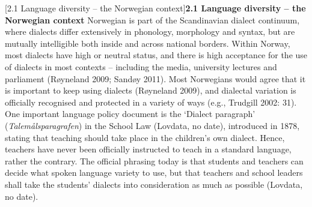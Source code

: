 \documentclass[12pt]{article}
\makeatletter
\renewcommand\section{\@startsection{section}{1}{0.0cm}{0in}{0.1mm}{\normalfont\normalsize\fontsize{12pt}{14.4pt}\selectfont\raggedright}}
\newenvironment{styleStandard}{\renewcommand\baselinestretch{1.0}\setlength\leftskip{0cm}\setlength\rightskip{0cm plus 1fil}\setlength\parindent{0cm}\setlength\parfillskip{0pt plus 1fil}\setlength\parskip{0in plus 1pt}\writerlistparindent\writerlistleftskip\leavevmode\normalfont\normalsize\writerlistlabel\ignorespaces}{\unskip\vspace{0in plus 1pt}\par}
\newcommand\writerlistleftskip{}
\newcommand\writerlistparindent{}
\newcommand\writerlistlabel{}
\makeatother
\begin{document}
\section[2.1 Language diversity – the Norwegian context]{\textbf{2.1 Language diversity – the Norwegian context}}
\begin{styleStandard}
Norwegian is part of the Scandinavian dialect continuum, where dialects differ extensively in phonology, morphology and syntax, but are mutually intelligible both inside and across national borders. Within Norway, most dialects have high or neutral status, and there is high acceptance for the use of dialects in most contexts – including the media, university lectures and parliament (Røyneland 2009; Sandøy 2011). Most Norwegians would agree that it is important to keep using dialects (Røyneland 2009), and dialectal variation is officially recognised and protected in a variety of ways (e.g., Trudgill 2002: 31). One important language policy document is the ‘Dialect paragraph’ (\textit{Talemålsparagrafen}) in the School Law (Lovdata, no date), introduced in 1878, stating that teaching should take place in the children’s own dialect. Hence, teachers have never been officially instructed to teach in a standard language, rather the contrary. The official phrasing today is that students and teachers can decide what spoken language variety to use, but that teachers and school leaders shall take the students’ dialects into consideration as much as possible (Lovdata, no date). 
\end{styleStandard}
\end{document}

